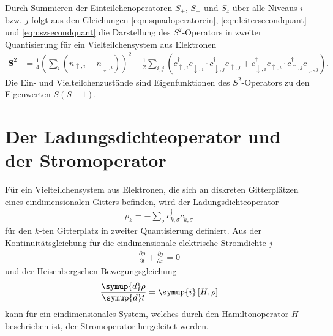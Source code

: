 Durch Summieren der Einteilchenoperatoren $S_{+}$, $S_{-}$ und $S_{z}$ über alle Niveaus $i$ bzw. $j$ folgt aus den Gleichungen \eqref{eqn:squadoperatorein}, \eqref{eqn:leitersecondquant}
und \eqref{eqn:szsecondquant} die Darstellung des $S^2$-Operators in zweiter Quantisierung für ein Vielteilchensystem aus Elektronen
\begin{align}
  \symbf{S}^2 & = \frac14 \left(\sum_{i} \left( n_{\uparrow,i} - n_{\downarrow,i}\right)\right)^2 +
  \frac12  \sum_{i,j}\left( c_{\uparrow,i}^\dag c_{\downarrow,i}^{\phantom{\dag}} \cdot c_{\downarrow,j}^\dag c_{\uparrow,j}^{\phantom{\dag}} +
  c_{\downarrow,i}^\dag c_{\uparrow,i}^{\phantom{\dag}} \cdot c_{\uparrow,j}^\dag c_{\downarrow,j}^{\phantom{\dag}} \right) .
  \label{eqn:squadoperatorviel}
\end{align}
Die Ein- und Vielteilchenzustände sind Eigenfunktionen des $S^2$-Operators zu den Eigenwerten $S(S+1)$.
\cite{schwabl,czycholl}

\section{Der Ladungsdichteoperator und der Stromoperator}
\label{sec:stromoperator}

Für ein Vielteilchensystem aus Elektronen, die sich an diskreten Gitterplätzen eines eindimensionalen Gitters befinden, wird der Ladungsdichteoperator
\begin{align}
  \rho_k = - \sum_{\sigma} c_{k,\sigma}^{\dag} c_{k,\sigma}^{\phantom{\dag}}
  \label{eqn:ladungsdichteoperator}
\end{align}
für den $k$-ten Gitterplatz in zweiter Quantisierung definiert.
Aus der Kontinuitätsgleichung für die eindimensionale elektrische Stromdichte $j$
\begin{align}
  \frac{\partial \rho}{\partial t} + \frac{\partial j}{\partial x} = 0
\end{align}
und der Heisenbergschen Bewegungsgleichung
\begin{align}
  \frac{\symup{d}\rho}{\symup{d}t} = \symup{i} \left[ H,\rho \right]
\end{align}
kann für ein eindimensionales System, welches durch den Hamiltonoperator $H$ beschrieben ist,
der Stromoperator hergeleitet werden. \cite{schwabl,czycholl}
